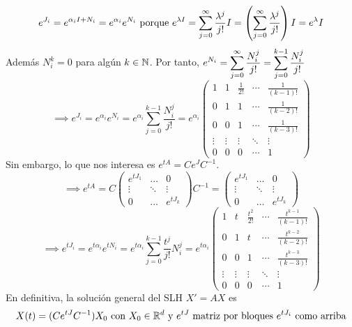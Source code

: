 \[e^{J_i} = e^{\alpha_i I + N_i} = e^{\alpha_i} e^{N_i} \text{ porque } e^{\lambda I} = \sum_{j=0}^{\infty} \frac{\lambda^j}{j!} I = \left(\sum_{j=0}^{\infty} \frac{\lambda^j}{j!}\right) I = e^{\lambda} I\]
Además $N_i^k = 0$ para algún $k \in \mathbb{N}$. Por tanto, $\displaystyle e^{N_i} = \sum_{j=0}^{\infty} \frac{N_i^j}{j!} = \sum_{j=0}^{k-1} \frac{N_i^j}{j!}$
\[\implies e^{J_i} = e^{\alpha_i} e^{N_i} = e^{\alpha_i} \sum_{j=0}^{k-1} \frac{N_i^j}{j!} = e^{\alpha_i} \begin{pmatrix}
		1      & 1      & \frac{1}{2!} & \cdots & \frac{1}{(k-1)!} \\
		0      & 1      & 1            & \cdots & \frac{1}{(k-2)!} \\
		0      & 0      & 1            & \cdots & \frac{1}{(k-3)!} \\
		\vdots & \vdots & \vdots       & \ddots & \vdots           \\
		0      & 0      & 0            & \cdots & 1
	\end{pmatrix}\]
Sin embargo, lo que nos interesa es $e^{tA} = Ce^{J}C^{-1}$.
\[\implies e^{tA} = C \begin{pmatrix}
		e^{t J_1} & \dots  & 0         \\
		\vdots    & \ddots & \vdots    \\
		0         & \dots  & e^{t J_k}
	\end{pmatrix} C^{-1} = \begin{pmatrix}
		e^{t J_1} & \dots  & 0         \\
		\vdots    & \ddots & \vdots    \\
		0         & \dots  & e^{t J_k}
	\end{pmatrix}\]
\[\implies e^{t J_i} = e^{t\alpha_i}e^{tN_i} = e^{t\alpha_i} \sum_{j=0}^{k-1} \frac{t^j}{j!} N_i^j = e^{t\alpha_i} \begin{pmatrix}
		1      & t      & \frac{t^2}{2!} & \cdots & \frac{t^{k-1}}{(k-1)!} \\
		0      & 1      & t              & \cdots & \frac{t^{k-2}}{(k-2)!} \\
		0      & 0      & 1              & \cdots & \frac{t^{k-3}}{(k-3)!} \\
		\vdots & \vdots & \vdots         & \ddots & \vdots                 \\
		0      & 0      & 0              & \cdots & 1
	\end{pmatrix}\]
En definitiva, la solución general del SLH $X' = AX$ es
\[X(t) = (Ce^{tJ}C^{-1})X_0 \text{ con } X_0 \in \mathbb{R}^d \text{ y } e^{tJ} \text{ matriz por bloques } e^{tJ_i} \text{ como arriba}\]

